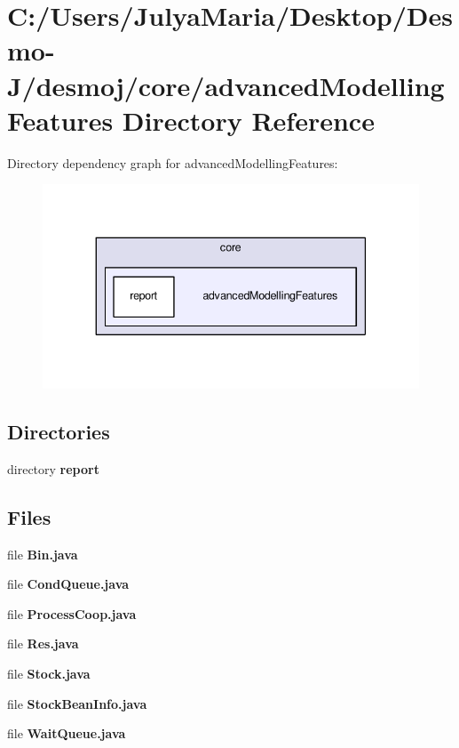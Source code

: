 \section{C\-:/\-Users/\-Julya\-Maria/\-Desktop/\-Desmo-\/\-J/desmoj/core/advanced\-Modelling\-Features Directory Reference}
\label{dir_61fb8f911718ae93a33bf7799ee38fec}
Directory dependency graph for advanced\-Modelling\-Features\-:
\nopagebreak
\begin{figure}[H]
\begin{center}
\leavevmode
\includegraphics[width=338pt]{dir_61fb8f911718ae93a33bf7799ee38fec_dep}
\end{center}
\end{figure}
\subsection*{Directories}
\begin{DoxyCompactItemize}
\item 
directory {\bf report}
\end{DoxyCompactItemize}
\subsection*{Files}
\begin{DoxyCompactItemize}
\item 
file {\bfseries Bin.\-java}
\item 
file {\bfseries Cond\-Queue.\-java}
\item 
file {\bfseries Process\-Coop.\-java}
\item 
file {\bfseries Res.\-java}
\item 
file {\bfseries Stock.\-java}
\item 
file {\bfseries Stock\-Bean\-Info.\-java}
\item 
file {\bfseries Wait\-Queue.\-java}
\end{DoxyCompactItemize}
